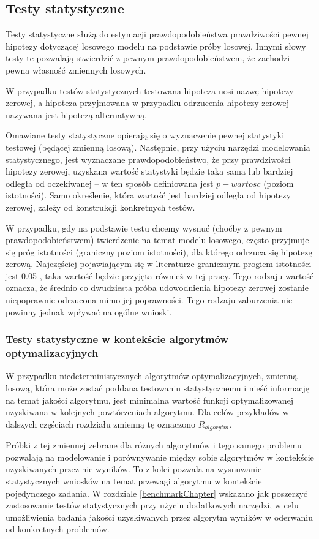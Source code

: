 \documentclass[12pt,a4paper]{report}
\begin{document}
{{{\subsection{Testy statystyczne}
\label{TestingStats}
\par{
Testy statystyczne służą do estymacji prawdopodobieństwa prawdziwości pewnej hipotezy dotyczącej losowego modelu na podstawie próby losowej. Innymi słowy testy te pozwalają stwierdzić z pewnym prawdopodobieństwem, że zachodzi pewna własność zmiennych losowych.
}
\par{
W przypadku testów statystycznych testowana hipoteza nosi nazwę hipotezy zerowej, a hipoteza przyjmowana w przypadku odrzucenia hipotezy zerowej nazywana jest hipotezą alternatywną.
}
\par{
Omawiane testy statystyczne opierają się o wyznaczenie pewnej statystyki testowej (będącej zmienną losową). Następnie, przy użyciu narzędzi modelowania statystycznego, jest wyznaczane prawdopodobieństwo, że przy prawdziwości hipotezy zerowej, uzyskana wartość statystyki będzie taka sama lub bardziej odległa od oczekiwanej -- w ten sposób definiowana jest $p-wartosc$ (poziom istotności). Samo określenie, która wartość jest bardziej odległa od hipotezy zerowej, zależy od konstrukcji konkretnych testów.
}
\par{
W przypadku, gdy na podstawie testu chcemy wysnuć (choćby z pewnym prawdopodobieństwem) twierdzenie na temat modelu losowego, często przyjmuje się próg istotności (graniczny poziom istotności), dla którego odrzuca się hipotezę zerową. Najczęściej pojawiającym się w literaturze granicznym progiem istotności jest 0.05 \cite{lowry}, taka wartość będzie przyjęta również w tej pracy. Tego rodzaju wartość oznacza, że średnio co dwudziesta próba udowodnienia hipotezy zerowej zostanie niepoprawnie odrzucona mimo jej poprawności. Tego rodzaju zaburzenia nie powinny jednak wpływać na ogólne wnioski.
}
\subsubsection{Testy statystyczne w kontekście algorytmów optymalizacyjnych}
\par{
W przypadku niedeterministycznych algorytmów optymalizacyjnych, zmienną losową, która może zostać poddana testowaniu statystycznemu i nieść informację na temat jakości algorytmu, jest minimalna wartość funkcji optymalizowanej uzyskiwana w kolejnych powtórzeniach algorytmu. Dla celów przykładów w dalszych częściach rozdziału zmienną tę oznaczono $R_{algorytm}$.
}
\par{
Próbki z tej zmiennej zebrane dla różnych algorytmów i tego samego problemu pozwalają na modelowanie i porównywanie między sobie algorytmów w kontekście uzyskiwanych przez nie wyników. To z kolei pozwala na wysnuwanie statystycznych wniosków na temat przewagi algorytmu w kontekście pojedynczego zadania. W rozdziale \ref{benchmarkChapter} wskazano jak poszerzyć zastosowanie testów statystycznych przy użyciu dodatkowych narzędzi, w celu umożliwienia badania jakości uzyskiwanych przez algorytm wyników w oderwaniu od konkretnych problemów.
}}}}
\end{document}
